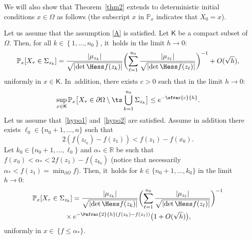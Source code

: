 We will also show that Theorem~\ref{thm2} extends to deterministic initial conditions $x\in
\Omega$ as follows (the subscript $x$ in $\mathbb P_{x}$ indicates
that $X_0=x$).
\begin{theorem}\label{thm3}
Let us assume that the assumption \ref{A} is satisfied. Let $\mathsf K$ be a compact subset of~$\Omega$. Then, for all $k\in \left\{1,\ldots,n_0\right\}$, it~holds in the limit $h\to 0$:
\begin{equation}\label{eq.px1}
\mathbb P_{x}[X_{\tau}\in \Sigma_{z_k}]= \frac{ \vert \mu_{z_k}\vert }{\sqrt{\vert {\det \Hess f (z_k)} \vert } }
\biggl (\sum_{\ell=1}^{n_0} \frac{ \vert \mu_{z_\ell}\vert }{\sqrt{\vert {\det \Hess f (z_\ell)} \vert } } \biggr)^{-1} + O({\sqrt h}),
\end{equation}
uniformly in $x\in \mathsf K$. In~addition, there exists $c>0$ such that in the limit $h\to 0$:
\begin{equation}\label{eq.px2}
\sup_{x\in \mathsf K}\mathbb P_{x}\bigl[X_{\tau}\in \partial \Omega \setminus\ts\bigcup_{k=1}^{n_0}\Sigma_{z_k}\bigr]\le e^{-\sfrac{c}{h}}.
\end{equation}
Let us assume that~\eqref{hypo1} and~\eqref{hypo2} are satisfied. Assume in addition there exists $\ell_0\in \{n_0+1,\ldots,n\}$ such
that
\begin{equation}\label{eq:hypo2_bis}
2(f(z_{\ell_0})-f(z_1))<f(z_1)-f(x_0).
\end{equation}
Let $k_0\in \{ n_0+1,\ldots,\ell_0\}$ and $ \alpha_* \in \mathbb R$ be such
that $f(x_0) < \alpha_*< 2 f(z_1)-f(z_{k_0})$ (notice that
necessarily $\alpha_*< f(z_1)=\min_{\partial \Omega}f$).
Then, it~holds for $k\in
\{ n_0+1,\ldots,k_0\}$ in the limit $h\to 0$:
\begin{multline}\label{eq.px3}
\mathbb P_{x}[X_{\tau}\in \Sigma_{z_k}]= \frac{ \vert \mu_{z_k}\vert }{\sqrt{\vert {\det \Hess f (z_k)} \vert } }
\biggl (\sum_{\ell=1}^{n_0} \frac{ \vert \mu_{z_\ell}\vert }{\sqrt{
\vert {\det \Hess f (z_\ell)} \vert } } \biggr)^{-1}\\
{}\times
e^{-\Psfrac{2}{h}(f(z_k)-f(z_1))}\bigl(1+ O({\sqrt h}) \bigr),
\end{multline}
uniformly in $x \in \, {\{ f\le \alpha_*\}}$.
\end{theorem}

